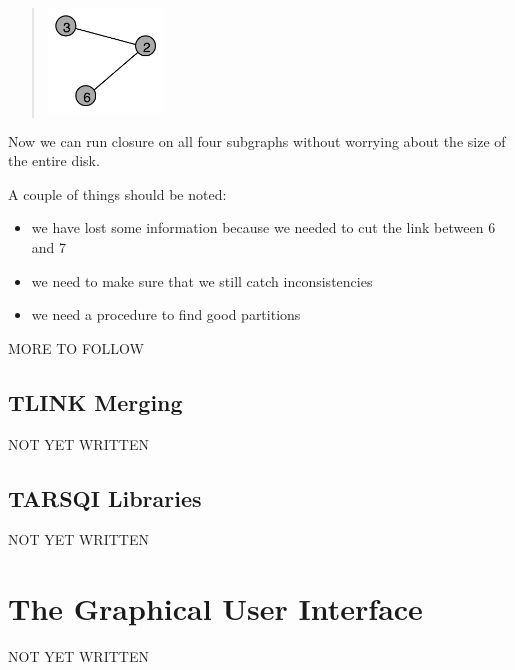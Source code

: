 \documentclass[11pt]{article}
\begin{document}
\begin{quote}
\includegraphics[width=1.2in]{images/closure3.png} 
\end{quote}

Now we can run closure on all four subgraphs without worrying about the size of the entire disk. 

\newpage
A couple of things should be noted:

\begin{itemize}
\item we have lost some information because we needed to cut the link between 6 and 7
\item we need to make sure that we still catch inconsistencies
\item we need a procedure to find good partitions
\end{itemize}

MORE TO FOLLOW


\subsection{TLINK Merging}

NOT YET WRITTEN

\subsection{TARSQI Libraries}

NOT YET WRITTEN


\section{The Graphical User Interface}

NOT YET WRITTEN




 
\end{document}
